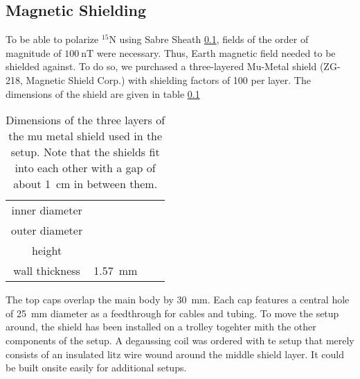         \subsection{Magnetic Shielding}
        To be able to polarize $^{15}\mathrm{N}$ using Sabre Sheath \ref{}, fields of the order of
            magnitude of $\SI{100}{\nano\tesla}$ were necessary. Thus, Earth magnetic field needed to
            be shielded against. To do so, we purchased a three-layered Mu-Metal shield (ZG-218, Magnetic
            Shield Corp.) with shielding factors of 100 per layer. The dimensions of the shield are given in table \ref{}
            \begin{table}
                \centering
                \begin{tabular}{cccc}
                    inner diameter & & & \\
                    outer diameter & & & \\
                    height & & &\\
                    wall thickness &\SI{1.57}{\mm} 
                \end{tabular}
                \caption[Shield dimensions]{Dimensions of the three layers of the mu metal shield used in the setup. Note that the shields  fit into each other with a gap of about \SI{1}{\cm} in between them.}
            \end{table}
            The top caps overlap the main body by \SI{30}{\mm}. Each cap features a central hole of \SI{25}{\mm} diameter as a feedthrough for cables and tubing. To move the setup around, the shield has been installed on a trolley togehter mith the other components of the setup. A degaussing coil was ordered with te setup that merely consists of an insulated litz wire wound around the middle shield layer. It could be built onsite easily for additional setups.
